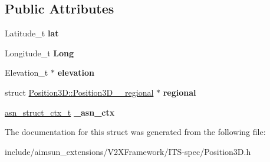 \subsection*{Public Attributes}
\begin{DoxyCompactItemize}
\item 
Latitude\+\_\+t {\bfseries lat}\hypertarget{structPosition3D_acfc5534af61b6475db89d1e78d37da0f}{}\label{structPosition3D_acfc5534af61b6475db89d1e78d37da0f}

\item 
Longitude\+\_\+t {\bfseries Long}\hypertarget{structPosition3D_af5f6cdfcd80cf7aa0225d71a12dbafa6}{}\label{structPosition3D_af5f6cdfcd80cf7aa0225d71a12dbafa6}

\item 
Elevation\+\_\+t $\ast$ {\bfseries elevation}\hypertarget{structPosition3D_a867da187db291f99a02e2090602791ea}{}\label{structPosition3D_a867da187db291f99a02e2090602791ea}

\item 
struct \hyperlink{structPosition3D_1_1Position3D____regional}{Position3\+D\+::\+Position3\+D\+\_\+\+\_\+regional} $\ast$ {\bfseries regional}\hypertarget{structPosition3D_a6649ff2c3e4ba22d71a222513b3f3b7d}{}\label{structPosition3D_a6649ff2c3e4ba22d71a222513b3f3b7d}

\item 
\hyperlink{structasn__struct__ctx__s}{asn\+\_\+struct\+\_\+ctx\+\_\+t} {\bfseries \+\_\+asn\+\_\+ctx}\hypertarget{structPosition3D_aa5cd29c52bf081239a115a46af75c329}{}\label{structPosition3D_aa5cd29c52bf081239a115a46af75c329}

\end{DoxyCompactItemize}


The documentation for this struct was generated from the following file\+:\begin{DoxyCompactItemize}
\item 
include/aimsun\+\_\+extensions/\+V2\+X\+Framework/\+I\+T\+S-\/spec/Position3\+D.\+h\end{DoxyCompactItemize}
